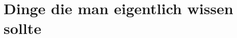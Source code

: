 \documentclass[twocolumn]{article}
\begin{document}
%                          
\section{Dinge die man eigentlich wissen sollte}
\end{document}
